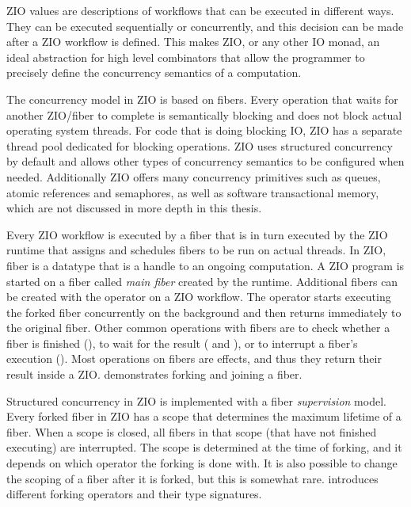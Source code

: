 ZIO values are descriptions of workflows that can be executed in different ways. They can be executed sequentially or concurrently, and this decision can be made after a ZIO workflow is defined. This makes ZIO, or any other IO monad, an ideal abstraction for high level combinators that allow the programmer to precisely define the concurrency semantics of a computation.

The concurrency model in ZIO is based on fibers. Every operation that waits for another ZIO/fiber to complete is semantically blocking and does not block actual operating system threads. For code that is doing blocking IO, ZIO has a separate thread pool dedicated for blocking operations. ZIO uses structured concurrency by default and allows other types of concurrency semantics to be configured when needed. Additionally ZIO offers many concurrency primitives such as queues, atomic references and semaphores, as well as software transactional memory, which are not discussed in more depth in this thesis.

Every ZIO workflow is executed by a fiber that is in turn executed by the ZIO runtime that assigns and schedules fibers to be run on actual threads. In ZIO, fiber is a datatype that is a handle to an ongoing computation. A ZIO program is started on a fiber called \emph{main fiber} created by the runtime. Additional fibers can be created with the  operator on a ZIO workflow. The  operator starts executing the forked fiber concurrently on the background and then returns immediately to the original fiber. Other common operations with fibers are to check whether a fiber is finished (), to wait for the result ( and ), or to interrupt a fiber's execution (). Most operations on fibers are effects, and thus they return their result inside a ZIO.  demonstrates forking and joining a fiber.



Structured concurrency in ZIO is implemented with a fiber \emph{supervision} model. Every forked fiber in ZIO has a scope that determines the maximum lifetime of a fiber. When a scope is closed, all fibers in that scope (that have not finished executing) are interrupted. The scope is determined at the time of forking, and it depends on which operator the forking is done with. It is also possible to change the scoping of a fiber after it is forked, but this is somewhat rare.  introduces different forking operators and their type signatures.

